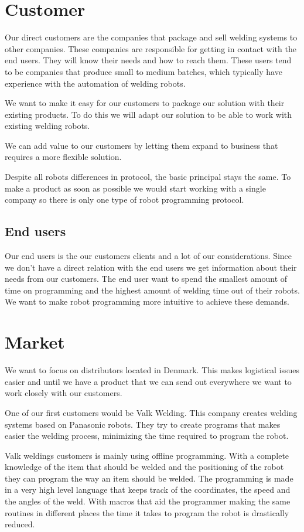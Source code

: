 \section{Customer}
Our direct customers are the companies that package and sell welding systems to other companies. 
These companies are responsible for getting in contact with the end users. 
They will know their needs and how to reach them. 
These users tend to be companies that produce small to medium batches, which typically have experience with the automation of welding robots.

We want to make it easy for our customers to package our solution with their existing products.
To do this we will adapt our solution to be able to work with existing welding robots.

We can add value to our customers by letting them expand to business that requires a more flexible solution.

Despite all robots differences in protocol, the basic principal stays the same.
To make a product as soon as possible we would start working with a single company so there is only one type of robot programming protocol.

\subsection{End users}
Our end users is the our customers clients and a lot of our considerations.
Since we don't have a direct relation with the end users we get information about their needs from our customers.
The end user want to spend the smallest amount of time on programming and the highest amount of welding time out of their robots.
We want to make robot programming more intuitive to achieve these demands.

\section{Market}
We want to focus on distributors located in Denmark.
This makes logistical issues easier and until we have a product that we can send out everywhere we want to work closely with our customers.

One of our first customers would be Valk Welding. This company creates welding systems based on Panasonic robots. They try to create programs that makes easier the welding process, minimizing the time required to program the robot.

Valk weldings customers is mainly using offline programming.
With a complete knowledge of the item that should be welded and the positioning of the robot they can program the way an item should be welded.
The programming is made in a very high level language that keeps track of the coordinates, the speed and the angles of the weld.
With macros that aid the programmer making the same routines in different places the time it takes to program the robot is drastically reduced.

